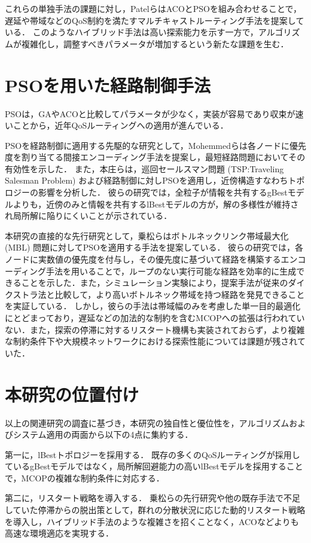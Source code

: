 これらの単独手法の課題に対し，PatelらはACOとPSOを組み合わせることで，遅延や帯域などのQoS制約を満たすマルチキャストルーティング手法を提案している\cite{Patel2014}．
このようなハイブリッド手法は高い探索能力を示す一方で，アルゴリズムが複雑化し，調整すべきパラメータが増加するという新たな課題を生む．

\section{PSOを用いた経路制御手法}
PSOは，GAやACOと比較してパラメータが少なく，実装が容易であり収束が速いことから，近年QoSルーティングへの適用が進んでいる．

PSOを経路制御に適用する先駆的な研究として，Mohemmedらは各ノードに優先度を割り当てる間接エンコーディング手法を提案し，最短経路問題においてその有効性を示した\cite{Mohemmed2008}．
また，本庄らは，巡回セールスマン問題 (TSP:Traveling Salesman Problem) および経路制御に対しPSOを適用し，近傍構造すなわちトポロジーの影響を分析した\cite{honjo2013}．
彼らの研究では，全粒子が情報を共有するgBestモデルよりも，近傍のみと情報を共有するlBestモデルの方が，解の多様性が維持され局所解に陥りにくいことが示されている．

本研究の直接的な先行研究として，乗松らはボトルネックリンク帯域最大化 (MBL) 問題に対してPSOを適用する手法を提案している\cite{norimatsu2024}．
彼らの研究では，各ノードに実数値の優先度を付与し，その優先度に基づいて経路を構築するエンコーディング手法を用いることで，ループのない実行可能な経路を効率的に生成できることを示した．また，シミュレーション実験により，提案手法が従来のダイクストラ法と比較して，より高いボトルネック帯域を持つ経路を発見できることを実証している．
しかし，彼らの手法は帯域幅のみを考慮した単一目的最適化にとどまっており，遅延などの加法的な制約を含むMCOPへの拡張は行われていない．また，探索の停滞に対するリスタート機構も実装されておらず，より複雑な制約条件下や大規模ネットワークにおける探索性能については課題が残されていた．

\section{本研究の位置付け}
以上の関連研究の調査に基づき，本研究の独自性と優位性を，アルゴリズムおよびシステム適用の両面から以下の4点に集約する．

第一に，lBestトポロジーを採用する．
既存の多くのQoSルーティングが採用しているgBestモデルではなく，局所解回避能力の高いlBestモデルを採用することで，MCOPの複雑な制約条件に対応する．

第二に，リスタート戦略を導入する．
乗松らの先行研究や他の既存手法で不足していた停滞からの脱出策として，群れの分散状況に応じた動的リスタート戦略を導入し，ハイブリッド手法のような複雑さを招くことなく，ACOなどよりも高速な環境適応を実現する．

